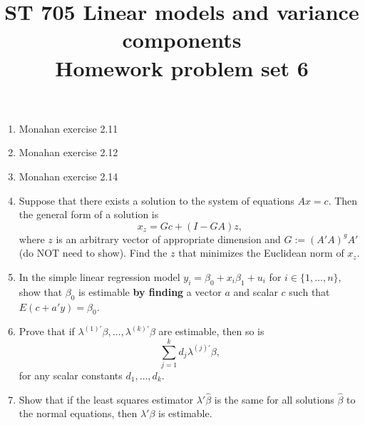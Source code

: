 \documentclass[11pt]{article}
\title{ST 705 Linear models and variance components \\ 
        Homework problem set 6}
\begin{document}
\maketitle

\begin{enumerate}

\item Monahan exercise 2.11

\item Monahan exercise 2.12

\item Monahan exercise 2.14

\item Suppose that there exists a solution to the system of equations $Ax = c$.  Then the general form of a solution is
\[
x_{z} = Gc + (I - GA)z,
\]
where $z$ is an arbitrary vector of appropriate dimension and $G := (A'A)^{g}A'$ (do NOT need to show).  Find the $z$ that minimizes the Euclidean norm of $x_{z}$.

\item In the simple linear regression model $y_{i} = \beta_{0} + x_{i}\beta_{1} + u_{i}$ for $i \in \{1,\dots,n\}$, show that $\beta_{0}$ is estimable \textbf{by finding} a vector $a$ and scalar $c$ such that $E(c + a'y) = \beta_{0}$.

\item Prove that if $\lambda^{(1)'}\beta,\dots,\lambda^{(k)'}\beta$ are estimable, then so is 
\[
\sum_{j=1}^{k}d_{j}\lambda^{(j)'}\beta,
\]
for any scalar constants $d_{1},\dots,d_{k}$.

\item Show that if the least squares estimator $\lambda'\widehat{\beta}$ is the same for all solutions $\widehat{\beta}$ to the normal equations, then $\lambda'\beta$ is estimable.

\end{enumerate}
\end{document}
